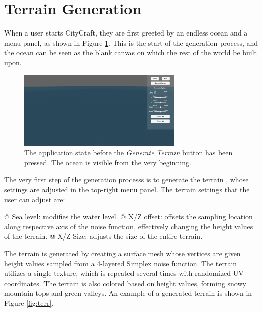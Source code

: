 \section{Terrain Generation}

When a user starts CityCraft, they are first greeted by an endless ocean and a menu panel, as shown in Figure \ref{fig:no_terr}.
This is the start of the generation process, and the ocean can be seen as the blank canvas on which the rest of the world be built upon.

\begin{figure}[H]
  \centering

  \includegraphics[width=0.7\textwidth]{figure/terrain_not_generated.png}
  \caption{The application state before the \textit{Generate Terrain} button has been pressed. The ocean is visible from the very beginning.}

  \label{fig:no_terr}
\end{figure}

The very first step of the generation processs is to generate the terrain
, whose settings are adjusted in the top-right menu panel.
The terrain settings that the user can adjust are:
\begin{easylist}
  @ Sea level: modifies the water level.
  @ X/Z offset: offsets the sampling location along respective axis of the noise function, effectively changing the height values of the terrain.
  @ X/Z Size: adjusts the size of the entire terrain.
\end{easylist}

The terrain is generated by creating a surface mesh whose vertices are given height values sampled from a 4-layered Simplex noise function.
The terrain utilizes a single texture, which is repeated several times with randomized UV coordinates.
The terrain is also colored based on height values, forming snowy mountain tops and green valleys.
An example of a generated terrain is shown in Figure \ref{fig:terr}.

